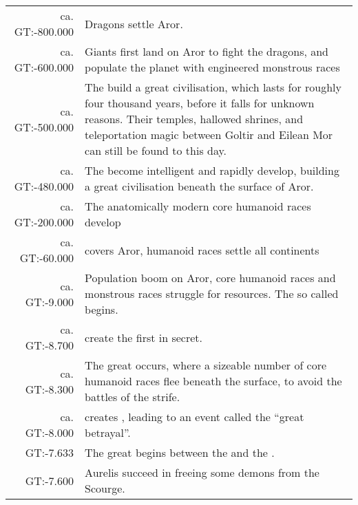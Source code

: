 \clearpage
\onecolumn
\begin{longtable}{@{\,}r <{\hskip 6pt} !{
  \color{LightSteelBlue3}
  \makebox[0pt]{\textbullet}
  \hskip -2.6pt
  \vrule width 1pt
  \hspace{\labelsep}
  }
  >{\raggedright\arraybackslash}p{11cm}
}
    ca. GT:-800.000  & Dragons settle Aror. \\
    ca. GT:-600.000  & Giants first land on Aror to fight the dragons, and
                       populate the planet with engineered monstrous races \\
    ca. GT:-500.000  & The  build a great civilisation,
                       which lasts for roughly four thousand years, before it
                       falls for unknown reasons. Their temples, hallowed
                       shrines, and teleportation magic between Goltir and
                       Eilean Mor can still be found to this day. \\
    ca. GT:-480.000  & The  become intelligent and rapidly
                       develop, building a great civilisation beneath the
                       surface of Aror. \\
    ca. GT:-200.000  & The anatomically modern core humanoid races develop \\
    ca. GT:-60.000   &  covers Aror, humanoid races
                       settle all continents \\
    ca. GT:-9.000    & Population boom on Aror, core humanoid races and
                       monstrous races struggle for resources. The so called
                        begins. \\
    ca. GT:-8.700    &  create the first 
                       in secret.\\
    ca. GT:-8.300    & The great  occurs, where a sizeable
                       number of core humanoid races flee beneath the surface,
                       to avoid the battles of the strife. \\
    ca. GT:-8.000    &  creates ,
                       leading to an event called the ``great betrayal''. \\
    GT:-7.633        & The great  begins between the
                        and the . \\
    GT:-7.600        & Aurelis succeed in freeing some demons from the Scourge.

\end{longtable}
